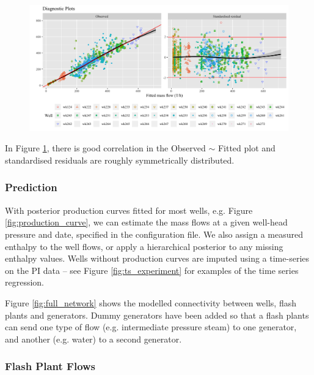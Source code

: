 \documentclass[a4paper, 12pt]{article}
\begin{document}
\begin{figure}
\centering
  \includegraphics[width=\linewidth]{media/diagnostics}
  \label{fig:diagnostics}
\end{figure}

In Figure \ref{fig:diagnostics}, there is good correlation in the Observed $\sim$ Fitted plot and standardised residuals are roughly symmetrically distributed. %

\subsubsection{Prediction}
With posterior production curves fitted for most wells, e.g. Figure \ref{fig:production_curve}, we can estimate the mass flows at a given well-head pressure and date, specified in the configuration file. We also assign a measured enthalpy to the well flows, or apply a hierarchical posterior to any missing enthalpy values. Wells without production curves are imputed using a time-series on the PI data -- see Figure \ref{fig:ts_experiment} for examples of the time series regression.

Figure \ref{fig:full_network} shows the modelled connectivity between wells, flash plants and generators. Dummy generators have been added so that a flash plants can send one type of flow (e.g. intermediate pressure steam) to one generator, and another (e.g. water) to a second generator.

\subsubsection{Flash Plant Flows}
\end{document}
